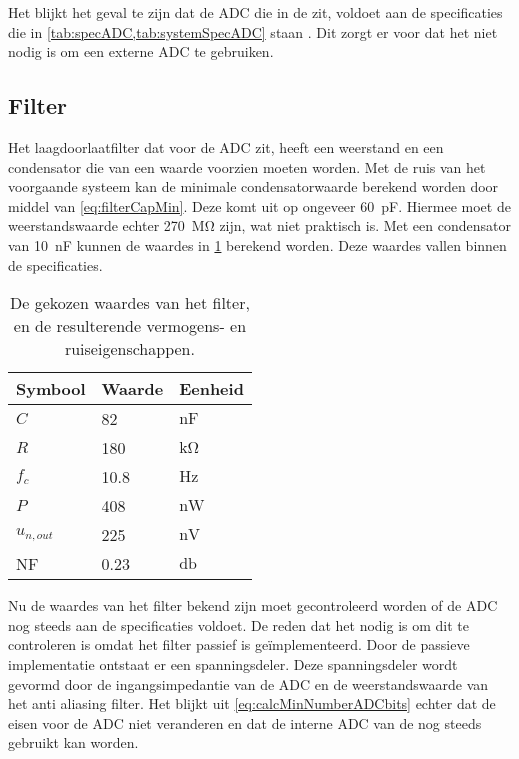 Het blijkt het geval te zijn dat de ADC die in de \mcu  zit, voldoet aan de specificaties die in \cref{tab:specADC,tab:systemSpecADC} staan \cite{nrf52810}. Dit zorgt er voor dat het niet nodig is om een externe ADC te gebruiken.

\subsection{Filter}
Het laagdoorlaatfilter dat voor de ADC zit, heeft een weerstand en een condensator die van een waarde voorzien moeten worden.
Met de ruis van het voorgaande systeem kan de minimale condensatorwaarde berekend worden door middel van \cref{eq:filterCapMin}. Deze komt uit op ongeveer \qty{60}{\pico\farad}. Hiermee moet de weerstandswaarde echter \qty{270}{\mega\ohm} zijn, wat niet praktisch is. Met een condensator van \qty{10}{\nano\farad} kunnen de waardes in \cref{tab:filterValues} berekend worden. Deze waardes vallen binnen de specificaties.

\begin{table}[ht]
    \centering
    \begin{tabular}{l|l|l}
        Symbool & Waarde & Eenheid \\
        \hline
        $C$         & 82    & $\si{\nano\farad}$\\
        $R$         & 180   & $\si{\kilo\ohm}$  \\
        $f_c$       & 10.8  & $\si{\hertz}$     \\
        $P$         & 408   & $\si{\nano\watt}$ \\
        $u_{n,out}$ & 225   & $\si{\nano\volt}$ \\
        NF          & 0.23  & $\si{\decibel}$   \\
    \end{tabular}
    \caption{De gekozen waardes van het filter, en de resulterende vermogens- en ruiseigenschappen.}
    \label{tab:filterValues}
\end{table}

Nu de waardes van het filter bekend zijn moet gecontroleerd worden of de ADC nog steeds aan de specificaties voldoet. De reden dat het nodig is om dit te controleren is omdat het filter passief is geïmplementeerd. Door de passieve implementatie ontstaat er een spanningsdeler. Deze spanningsdeler wordt gevormd door de ingangsimpedantie van de ADC en de weerstandswaarde van het anti aliasing filter. Het blijkt uit \cref{eq:calcMinNumberADCbits} echter dat de eisen voor de ADC niet veranderen en dat de interne ADC van de \mcu nog steeds gebruikt kan worden.


